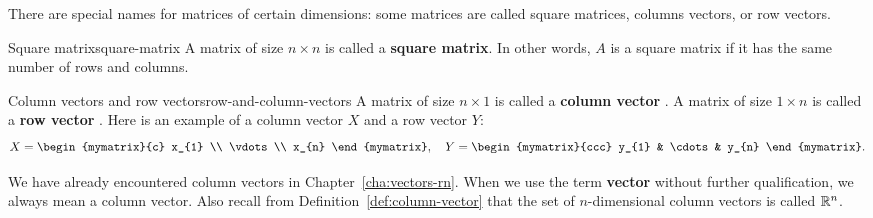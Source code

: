 There are special names for matrices of certain dimensions: some
matrices are called square matrices, columns vectors, or row vectors.

\begin{definition}{Square matrix}{square-matrix}
  A matrix of size $n\times n$ is called a \textbf{square
    matrix}.  In other
  words, $A$ is a square matrix if it has the same number of rows and
  columns.
\end{definition}

\begin{definition}{Column vectors and row vectors}{row-and-column-vectors}
  A matrix of size $n\times 1$ is called a \textbf{column vector}%
  . A matrix of size
  $1\times n$ is called a \textbf{row vector}%
  .
  Here is an example of a column vector $X$ and a row vector $Y$:
  \begin{equation*}
    X=\begin{mymatrix}{c}
      x_{1} \\
      \vdots \\
      x_{n}
    \end{mymatrix},
    \quad
    Y = \begin{mymatrix}{ccc}
      y_{1} & \cdots & y_{n}
    \end{mymatrix}.
  \end{equation*}
\end{definition}

We have already encountered column vectors in
Chapter~\ref{cha:vectors-rn}.  When we use the term \textbf{vector}
without further qualification, we always mean a column vector. Also
recall from Definition~\ref{def:column-vector} that the set of
$n$-dimensional column vectors is called $\mathbb{R}^n$.
